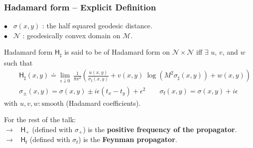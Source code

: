 \documentclass[9pt]{beamer}
\newcommand{\Mcal}{\mathcal{M}}
\newcommand{\Ncal}{\mathcal{N}}
\newcommand{\Hsf}{\mathsf{H}}
\newcommand{\fsf}{\mathsf{f}}
\begin{document}
\begin{frame}

\frametitle{Hadamard form -- Explicit Definition}

\vfill

$\bullet$ \ $\sigma(x,y)$ : the half squared geodesic distance. \\[2pt]

$\bullet$ \ $\Ncal$ : geodesically convex domain on $\Mcal$.

\vfill

\begin{block}{Hadamard form}
$\Hsf_\sharp$ is said to be of Hadamard form on $\Ncal \times \Ncal$ iff $\exists$ $u$, $v$, and $w$ such that
\begin{eqnarray*}
&& \Hsf_\sharp(x,y) \doteq \lim_{\epsilon \downarrow 0} \ \frac{1}{8\pi^2}\left(\frac{u(x,y)}{\sigma_\sharp(x,y)}+v(x,y) \ \log(M^2 \sigma_\sharp(x,y))+w(x,y)\right)  \\[4pt]
&& \sigma_\pm(x,y) = \sigma(x,y) \pm i\epsilon(t_x-t_y) + \epsilon^2 \qquad \sigma_\fsf(x,y) = \sigma(x,y) + i\epsilon 
\end{eqnarray*}
with $u,v,w:  \mbox{smooth}$ (Hadamard coefficients).
\end{block}

For the rest of the talk: \\[2pt]
\qquad $\to$ \ $\Hsf_+$ (defined with $\sigma_+$) is the \textbf{positive frequency of the propagator}. \\
\qquad $\to$ \ $\Hsf_\fsf$ (defined with $\sigma_\fsf$) is the \textbf{Feynman propagator}.

\end{frame} 

\end{document}
